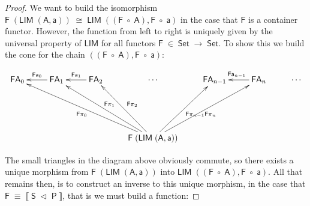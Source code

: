 \documentclass[a4paper]{article}
\newcommand{\Conid}[1]{\mathit{#1}}
\newcommand{\Varid}[1]{\mathit{#1}}
\renewcommand\Varid[1]{\mathord{\textsf{#1}}}
\let\Conid\Varid
\begin{document}
\begin{proof}
We want to build the isomorphism 
\ensuremath{\Conid{F}\;(\Conid{LIM}\;(\Conid{A},\Varid{a}))\;\cong\;\Conid{LIM}\;((\Conid{F}\;\ensuremath{\mbox{$\circ$}}\;\Conid{A}),\Conid{F}\;\ensuremath{\mbox{$\circ$}}\;\Varid{a})} in the case that \ensuremath{\Conid{F}}
is a container functor. However, the function from left to right is uniquely 
given by the universal property of \ensuremath{\Conid{LIM}} for all functors \ensuremath{\Conid{F}\;\in\;\Conid{Set}\;\rightarrow\;\Conid{Set}}. 
To show this we build the cone for the chain \ensuremath{((\Conid{F}\;\ensuremath{\mbox{$\circ$}}\;\Conid{A}),\Conid{F}\;\ensuremath{\mbox{$\circ$}}\;\Varid{a})}:


\[
\xymatrix{
\ensuremath{\Conid{F}} \ensuremath{\Conid{A}}_{0} &
\ar[l]_{\ensuremath{\Conid{F}} \ensuremath{\Varid{a}}_{0}}
\ensuremath{\Conid{F}} \ensuremath{\Conid{A}}_{1} &
\ar[l]_{\ensuremath{\Conid{F}} \ensuremath{\Varid{a}}_{1}}
\ensuremath{\Conid{F}} \ensuremath{\Conid{A}}_{2} &
\cdots &
\ensuremath{\Conid{F}} \ensuremath{\Conid{A}}_{n-1} &
\ar[l]_{\ensuremath{\Conid{F}} \ensuremath{\Varid{a}}_{n-1}} 
\ensuremath{\Conid{F}} \ensuremath{\Conid{A}}_{n} &
\cdots
\\
\\
& & &  
\ensuremath{\Conid{F}\;(\Conid{LIM}\;(\Conid{A},\Varid{a}))}
\ar[uulll]^{\ensuremath{\Conid{F}} \pi_{0}}
\ar[uull]_{\ensuremath{\Conid{F}} \pi_{1}}
\ar[uul]_{\ensuremath{\Conid{F}} \pi_{2}}
\ar[uur]_{\ensuremath{\Conid{F}} \pi_{n-1}}
\ar[uurr]_{\ensuremath{\Conid{F}} \pi_{n}}
&&&\\
} 
\]

\noindent
The small triangles in the diagram above obviously commute, so there exists a 
unique morphism from \ensuremath{\Conid{F}\;(\Conid{LIM}\;(\Conid{A},\Varid{a}))} into 
\ensuremath{\Conid{LIM}\;((\Conid{F}\;\ensuremath{\mbox{$\circ$}}\;\Conid{A}),\Conid{F}\;\ensuremath{\mbox{$\circ$}}\;\Varid{a})}.
All that remains then, is to construct an inverse to this unique morphism, in 
the case that \ensuremath{\Conid{F}\;\equiv\;\Varid{⟦}\;\Conid{S}\;\lhd\;\Conid{P}\;\Varid{⟧}}, that is we must build a function:




\end{proof}
\end{document}
